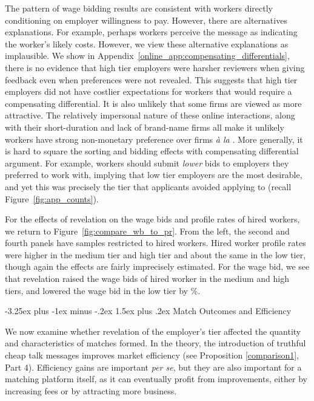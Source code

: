 \documentclass[12pt]{article}
\makeatletter
\renewcommand{\section}{%
  \@startsection{section}{1}{\z@}%
  {-3.5ex plus -1ex minus -.2ex}%
  {2.3ex plus.2ex}%
  {\normalfont\Large\bfseries}%
}
\renewcommand{\subsection}{%
  \@startsection{subsection}{2}{\z@}%
  {-3.25ex plus -1ex minus -.2ex}%
  {1.5ex plus .2ex}%
  {\normalfont\large\bfseries}%
}
\makeatother
\begin{document}
The pattern of wage bidding results are consistent with workers directly conditioning on employer willingness to pay.
However, there are alternatives explanations.
For example, perhaps workers perceive the message as indicating the worker's likely costs.
However, we view these alternative explanations as implausible. 
We show in Appendix~\ref{online_app:compensating_differentials}, there is no evidence that high tier employers were harsher reviewers when giving feedback even when preferences were not revealed.
This suggests that high tier employers did not have costlier expectations for workers that would require a compensating differential. 
It is also unlikely that some firms are viewed as more attractive.
The relatively impersonal nature of these online interactions, along with their short-duration and lack of brand-name firms all make it unlikely workers have strong non-monetary preference over firms \emph{\`{a} la} \cite{sorkin2018ranking}. 
More generally, it is hard to square the sorting and bidding effects with compensating differential argument. 
For example, workers should submit \emph{lower} bids to employers they preferred to work with, implying that low tier employers are the most desirable, and yet this was precisely the tier that applicants avoided applying to (recall Figure~\ref{fig:app_counts}).

For the effects of revelation on the wage bids and profile rates of hired workers, we return to Figure~\ref{fig:compare_wb_to_pr}.
From the left, the second and fourth panels have samples restricted to hired workers. 
Hired worker profile rates were higher in the medium tier and high tier and about the same in the low tier, though again the effects are fairly imprecisely estimated.
For the wage bid, we see that revelation raised the wage bids of hired worker in the medium and high tiers, and lowered the wage bid in the low tier by \EffectWageBidAppLowTierHiredRegression{}\%. 


\subsection{Match Outcomes and Efficiency} %

We now examine whether revelation of the employer's tier affected the quantity and characteristics of matches formed.
In the theory, the introduction of truthful cheap talk messages improves market efficiency (see Proposition \ref{comparison1}, Part 4).
Efficiency gains are important \emph{per se}, but they are also important for a matching platform itself, as it can eventually profit from improvements, either by increasing fees or by attracting more business. 
\end{document}
